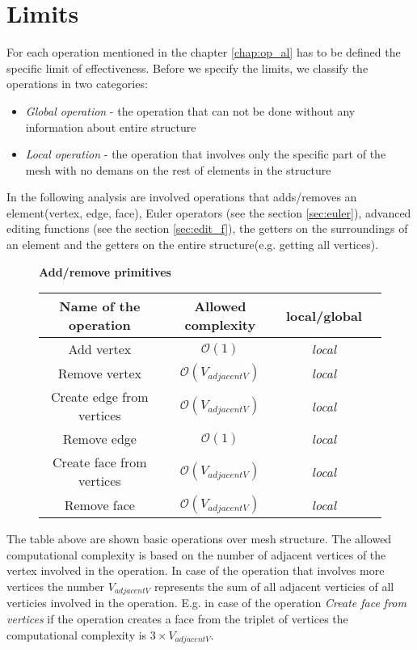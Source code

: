 \section{Limits}

For each operation mentioned in the chapter \ref{chap:op_al} has to be defined the specific limit
of effectiveness. Before we specify the limits, we classify the operations in two categories:

\begin{itemize}
\item \emph{Global operation} - the operation that can not be done without any information
about entire structure
\item \emph{Local operation} - the operation that involves only the specific part of the mesh
with no demans on the rest of elements in the structure
\end{itemize}
In the following analysis are involved operations that adds/removes an element(vertex, edge, face),
Euler operators (see the section \ref{sec:euler}), advanced editing functions (see the
section \ref{sec:edit_f}),
the getters on the surroundings of an element and the getters
on the entire structure(e.g. getting all vertices).

\begin{figure}[!htbp]

\centering
\textbf{Add/remove primitives}\\
\label{fig:comp_prim}
\vspace{2mm}
\begin{tabular}{| c | c | c | c |}
\hline
\textbf{Name of the operation} & \textbf{Allowed complexity} & \textbf{local/global}\\
\hline
Add vertex & $\mathcal{O}(1)$ & \emph{local}\\
\hline
Remove vertex & $\mathcal{O}(V_{adjacentV})$ & \emph{local}\\
\hline
Create edge from vertices& $\mathcal{O}(V_{adjacentV})$ & \emph{local}\\
\hline
Remove edge & $\mathcal{O}(1)$ & \emph{local}\\
\hline
Create face from vertices& $\mathcal{O}(V_{adjacentV})$ & \emph{local}\\
\hline
Remove face & $\mathcal{O}(V_{adjacentV})$ & \emph{local}\\
\hline
\end{tabular}
\end{figure}

The table above are shown basic operations over mesh structure. The allowed
computational complexity is based on the number of adjacent vertices of the vertex involved
in the operation. In case of the operation that involves more vertices the number $V_{adjacentV}$
represents the sum of all adjacent verticies of all verticies involved in the operation.
E.g. in case of the operation \emph{Create face from vertices} if the operation creates a
face from the triplet of vertices the computational complexity is $3 \times V_{adjacentV}$.

